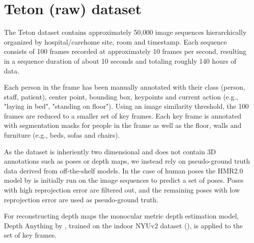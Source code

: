 
\section{Teton (raw) dataset}
The Teton dataset contains approximately 50,000 image sequences hierarchically organized by hospital/carehome site, room and timestamp. Each sequence consists of 100 frames recorded at approximately 10 frames per second, resulting in a sequence duration of about 10 seconds and totaling roughly 140 hours of data. 

Each person in the frame has been manually annotated with their class (person, staff, patient), center point, bounding box, keypoints and current action (e.g., "laying in bed", "standing on floor"). Using an image similarity threshold, the 100 frames are reduced to a smaller set of key frames. Each key frame is annotated with segmentation masks for people in the frame as well as the floor, walls and furniture (e.g., beds, sofas and chairs).

As the dataset is inheriently two dimensional and does not contain 3D annotations such as poses or depth maps, we instead rely on pseudo-ground truth data derived from off-the-shelf models. In the case of human poses the HMR2.0 model by \cite{goel2023humans} is initially run on the image sequences to predict a set of poses. Poses with high reprojection error are filtered out, and the remaining poses with low reprojection error are used as pseudo-ground truth. 

For reconstructing depth maps the monocular metric depth estimation model, Depth Anything by \cite{depthanything}, trained on the indoor NYUv2 dataset (\cite{SilbermanECCV12}), is applied to the set of key frames.





